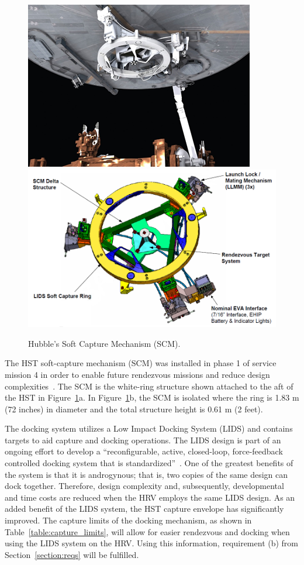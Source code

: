 \documentclass[paper=letter, fontsize=11pt]{scrartcl} %
\numberwithin{equation}{section} %
\numberwithin{figure}{section} %
\numberwithin{table}{section} %
\begin{document}
\begin{figure}[H]
\begin{center}
\includegraphics[width=.65\textwidth]{HST_Interface_Figures/H1A.png}
\includegraphics[width=.65\textwidth]{HST_Interface_Figures/H1B.png}
\caption{Hubble's Soft Capture Mechanism (SCM).}
\label{H1}
\end{center}
\end{figure}
The HST soft-capture mechanism (SCM) was installed in phase 1 of service mission 4 in order to enable future rendezvous missions and reduce design complexities~\cite{ref1}. The SCM is the white-ring structure shown attached to the aft of the HST in Figure~\ref{H1}a. In Figure~\ref{H1}b, the SCM is isolated where the ring is 1.83 m (72 inches) in diameter and the total structure height is 0.61 m (2 feet).

The docking system utilizes a Low Impact Docking System (LIDS) and contains targets to aid capture and docking operations. The LIDS design is part of an ongoing effort to develop a ``reconfigurable, active, closed-loop, force-feedback controlled docking system that is standardized''~\cite{ref3}. One of the greatest benefits of the system is that it is androgynous; that is, two copies of the same design can dock together. Therefore, design complexity and, subsequently, developmental and time costs are reduced when the HRV employs the same LIDS design. As an added benefit of the LIDS system, the HST capture envelope has significantly improved. The capture limits of the docking mechanism, as shown in Table~\ref{table:capture_limits}, will allow for easier rendezvous and docking when using the LIDS system on the HRV. Using this information, requirement (b) from Section~\ref{section:reqs} will be fulfilled.
\end{document}
